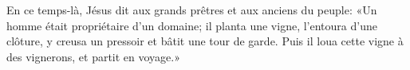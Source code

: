 En ce temps-là, Jésus dit aux grands prêtres et aux anciens du peuple:
	«Un homme était propriétaire d’un domaine;
	il planta une vigne, l’entoura d’une clôture,
	y creusa un pressoir et bâtit une tour de garde.
Puis il loua cette vigne à des vignerons, et partit en voyage.»
